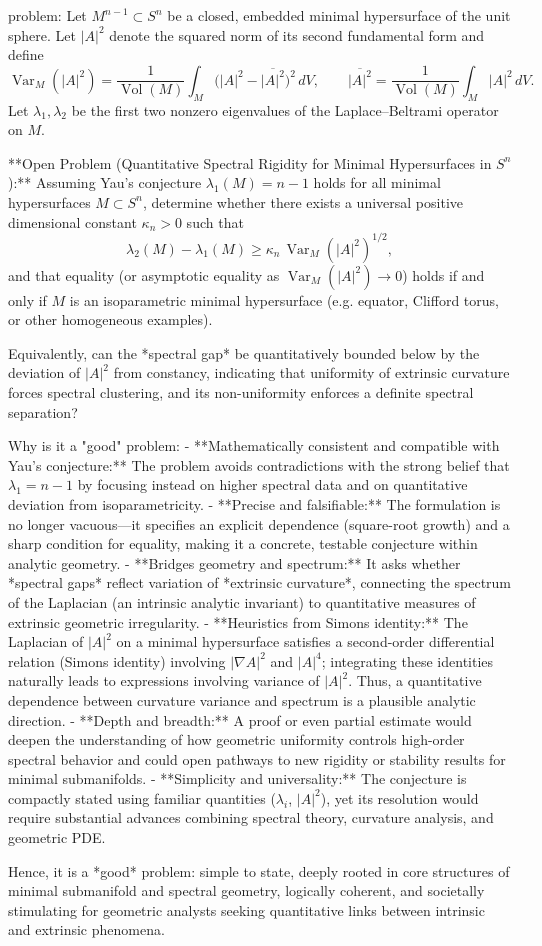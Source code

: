 problem:  
Let \( M^{n-1} \subset S^n \) be a closed, embedded minimal hypersurface of the unit sphere.  
Let \(|A|^2\) denote the squared norm of its second fundamental form and define  
\[
\operatorname{Var}_M(|A|^2) = \frac{1}{\operatorname{Vol}(M)} \int_M \big(|A|^2 - \overline{|A|^2}\big)^2\, dV,
\qquad 
\overline{|A|^2} = \frac{1}{\operatorname{Vol}(M)}\int_M |A|^2\, dV.
\]
Let \( \lambda_1, \lambda_2 \) be the first two nonzero eigenvalues of the Laplace–Beltrami operator on \(M\).  

**Open Problem (Quantitative Spectral Rigidity for Minimal Hypersurfaces in \(S^n\)):**  
Assuming Yau’s conjecture \( \lambda_1(M) = n - 1 \) holds for all minimal hypersurfaces \(M \subset S^n\), determine whether there exists a universal positive dimensional constant \( \kappa_n > 0 \) such that  
\[
\lambda_2(M) - \lambda_1(M) \ge \kappa_n\, \operatorname{Var}_M(|A|^2)^{1/2},
\]
and that equality (or asymptotic equality as \( \operatorname{Var}_M(|A|^2)\to 0\)) holds if and only if \( M \) is an isoparametric minimal hypersurface (e.g. equator, Clifford torus, or other homogeneous examples).  

Equivalently, can the *spectral gap* be quantitatively bounded below by the deviation of \(|A|^2\) from constancy, indicating that uniformity of extrinsic curvature forces spectral clustering, and its non-uniformity enforces a definite spectral separation?  

Why is it a "good" problem:  
- **Mathematically consistent and compatible with Yau’s conjecture:** The problem avoids contradictions with the strong belief that \( \lambda_1 = n-1 \) by focusing instead on higher spectral data and on quantitative deviation from isoparametricity.  
- **Precise and falsifiable:** The formulation is no longer vacuous—it specifies an explicit dependence (square-root growth) and a sharp condition for equality, making it a concrete, testable conjecture within analytic geometry.  
- **Bridges geometry and spectrum:** It asks whether *spectral gaps* reflect variation of *extrinsic curvature*, connecting the spectrum of the Laplacian (an intrinsic analytic invariant) to quantitative measures of extrinsic geometric irregularity.  
- **Heuristics from Simons identity:** The Laplacian of \(|A|^2\) on a minimal hypersurface satisfies a second-order differential relation (Simons identity) involving \(|\nabla A|^2\) and \(|A|^4\); integrating these identities naturally leads to expressions involving variance of \(|A|^2\). Thus, a quantitative dependence between curvature variance and spectrum is a plausible analytic direction.  
- **Depth and breadth:** A proof or even partial estimate would deepen the understanding of how geometric uniformity controls high-order spectral behavior and could open pathways to new rigidity or stability results for minimal submanifolds.  
- **Simplicity and universality:** The conjecture is compactly stated using familiar quantities (\(\lambda_i\), \(|A|^2\)), yet its resolution would require substantial advances combining spectral theory, curvature analysis, and geometric PDE.  

Hence, it is a *good* problem: simple to state, deeply rooted in core structures of minimal submanifold and spectral geometry, logically coherent, and societally stimulating for geometric analysts seeking quantitative links between intrinsic and extrinsic phenomena.